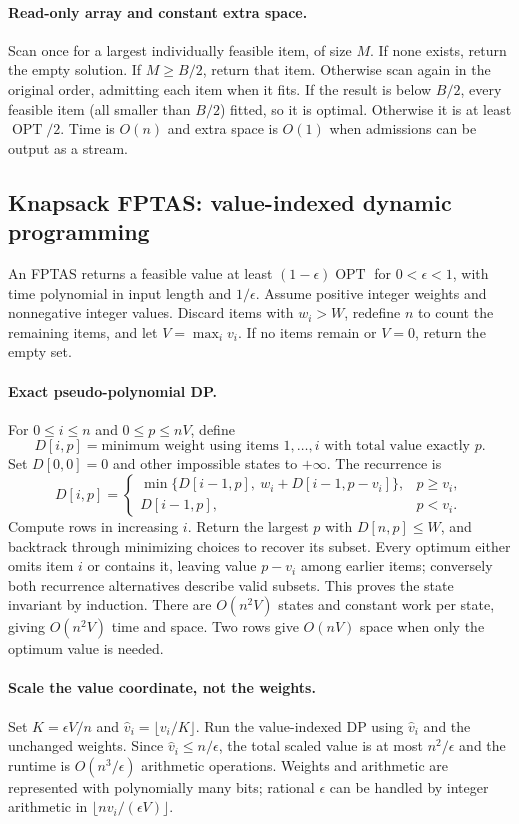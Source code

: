\documentclass[10pt]{article}
\theoremstyle{definition}
\newcommand{\OPT}{\operatorname{OPT}}
\begin{document}
\paragraph{Read-only array and constant extra space.}
Scan once for a largest individually feasible item, of size $M$. If none exists, return
the empty solution. If $M\ge B/2$, return that item. Otherwise scan again in the original
order, admitting each item when it fits. If the result is below $B/2$, every feasible item
(all smaller than $B/2$) fitted, so it is optimal. Otherwise it is at least $\OPT/2$.
Time is $O(n)$ and extra space is $O(1)$ when admissions can be output as a stream.

\subsection{Knapsack FPTAS: value-indexed dynamic programming}
\label{gre:fptas}
An FPTAS returns a feasible value at least $(1-\epsilon)\OPT$ for $0<\epsilon<1$, with
time polynomial in input length and $1/\epsilon$. Assume positive integer weights and
nonnegative integer values. Discard items with $w_i>W$, redefine $n$ to count the remaining
items, and let $V=\max_i v_i$. If no items remain or $V=0$, return the empty set.

\paragraph{Exact pseudo-polynomial DP.}
For $0\le i\le n$ and $0\le p\le nV$, define
\[
D[i,p]=\text{minimum weight using items }1,\ldots,i\text{ with total value exactly }p.
\]
Set $D[0,0]=0$ and other impossible states to $+\infty$. The recurrence is
\[
D[i,p]=
\begin{cases}
\min\{D[i-1,p],\ w_i+D[i-1,p-v_i]\},&p\ge v_i,\\
D[i-1,p],&p<v_i.
\end{cases}
\]
Compute rows in increasing $i$. Return the largest $p$ with $D[n,p]\le W$, and backtrack
through minimizing choices to recover its subset. Every optimum either omits item $i$ or
contains it, leaving value $p-v_i$ among earlier items; conversely both recurrence alternatives
describe valid subsets. This proves the state invariant by induction. There are $O(n^2V)$
states and constant work per state, giving $O(n^2V)$ time and space. Two rows give $O(nV)$
space when only the optimum value is needed.

\paragraph{Scale the value coordinate, not the weights.}
Set $K=\epsilon V/n$ and $\hat v_i=\lfloor v_i/K\rfloor$. Run the value-indexed DP using
$\hat v_i$ and the unchanged weights. Since $\hat v_i\le n/\epsilon$, the total scaled
value is at most $n^2/\epsilon$ and the runtime is $O(n^3/\epsilon)$ arithmetic operations.
Weights and arithmetic are represented with polynomially many bits; rational $\epsilon$
can be handled by integer arithmetic in $\lfloor nv_i/(\epsilon V)\rfloor$.
\end{document}
